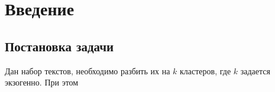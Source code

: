 \section{Введение}

\subsection{Постановка задачи}
Дан набор текстов, необходимо разбить их на $k$ кластеров, где $k$ задается экзогенно. При этом 